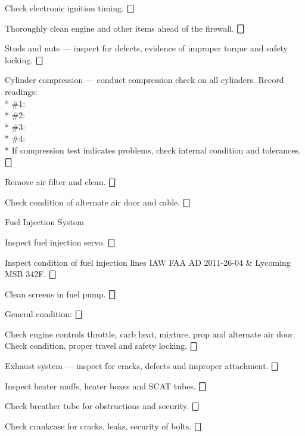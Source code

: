 \begin{enumerate*}
\begin{enumerate*}
\begin{enumerate*}
			\item Check electronic ignition timing. \dotfill $\bigbox$
		\end{enumerate*}
		\item Thoroughly clean engine and other items ahead of the firewall. \dotfill $\bigbox$
		\item Studs and nuts --- inspect for defects, evidence of improper torque and safety locking. \dotfill $\bigbox$
  	\item Cylinder compression --- conduct compression check on all cylinders.  Record readings: \\* \#1:\hfill \underline{\makebox[0.5in][l]{}} \\* \hfill \#2:\underline{\makebox[0.5in][l]{}} \\* \hfill \#3:\underline{\makebox[0.5in][l]{}} \\* \hfill \#4:\underline{\makebox[0.5in][l]{}} \\*  If compression test indicates problems, check internal condition and tolerances. \dotfill $\bigbox$
		\item Remove air filter and clean.  \dotfill $\bigbox$
		\item Check condition of alternate air door and cable. \dotfill $\bigbox$
		\item Fuel Injection System
		\begin{enumerate*}
  		\item Inspect fuel injection servo. \dotfill $\bigbox$
  		\item Inspect condition of fuel injection lines IAW FAA AD 2011-26-04 \& Lycoming MSB 342F. \dotfill $\bigbox$
		\end{enumerate*}
		\item Clean screens in fuel pump.  \dotfill $\bigbox$
		\item General condition: \dotfill $\bigbox$
		\begin{enumerate*}
		\item Check engine controls throttle, carb heat, mixture, prop and alternate air door.  Check condition, proper travel and safety locking. \dotfill $\bigbox$
		\item Exhaust system --- inspect for cracks, defects and improper attachment. \dotfill $\bigbox$
		\item Inspect heater muffs, heater boxes and SCAT tubes. \dotfill $\bigbox$
		\item Check breather tube for obstructions and security. \dotfill $\bigbox$
		\item Check crankcase for cracks, leaks, security of bolts. \dotfill $\bigbox$

\end{enumerate*}
\end{enumerate*}
\end{enumerate*}
